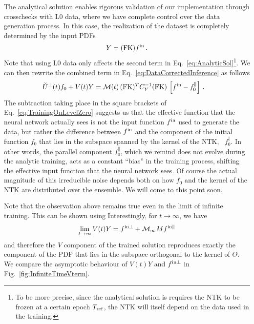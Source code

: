 The analytical solution enables rigorous validation of our implementation 
through crosschecks with L0 data, where we have complete control over 
the data generation process. In this case, the realization of the dataset is 
completely determined by the input PDFs
\begin{equation}
    \label{eq:DataL0NoIndices}
    Y = (\mathrm{FK}) f^{\rm in}\, .
\end{equation}
Note that using L0 data only affects the second term in
Eq.~\ref{eq:AnalyticSol}\footnote{To be more precise, since the analytical
solution is requires the NTK to be frozen at a certain epoch $T_{\rm ref}$, the
NTK will itself depend on the data used in the training.}. We can then rewrite
the combined term in Eq.~\eqref{eq:DataCorrectedInference} as follows
\begin{align}
  \label{eq:TrainingOnLevelZero}
  \check{U}^\perp(t) f_0 + V(t) Y 
    &= \mathcal{M}(t)\, (\mathrm{FK})^T C_{Y}^{-1} (\mathrm{FK})\, 
      \left[f^{\rm in} - f_{0}^\parallel\right]\, .
\end{align}
The subtraction taking place in the square brackets of
Eq.~\eqref{eq:TrainingOnLevelZero} suggests us that the effective function that
the neural network actually sees is not the input function $f^{\rm in}$ used to
generate the data, but rather the difference between $f^{\rm in}$ and the component of
the initial function $f_0$ that lies in the subspace spanned by the kernel of
the NTK, \ie\ $f_0^\parallel$. In other words, the parallel component
$f_0^\parallel$, which we remind does not evolve during the analytic training,
acts as a constant ``bias'' in the training process, shifting the effective
input function that the neural network sees. Of course the actual magnitude of
this irreducible noise depends both on how $f_0$ and the kernel of the NTK are
distributed over the ensemble. We will come to this point soon.

Note that the observation above remains true even in the limit of infinite
training. This can be shown using Interestingly, for $t\to\infty$, we have
\begin{align}
    \label{eq:LevelZeroClosureInfiniteTraining}
    \lim_{t\to\infty} V(t) Y = f^{\rm in \perp} + \mathcal{M}_{\infty} M f^{\rm in \parallel}
\end{align}
and therefore the $V$ component of the trained solution reproduces exactly the
component of the PDF that lies in  the subspace orthogonal to the kernel of
$\Theta$. We compare the asymptotic behaviour of $V(t) Y$ and $f^{\rm in \perp}$ in
Fig.~\ref{fig:InfiniteTimeVterm}.

